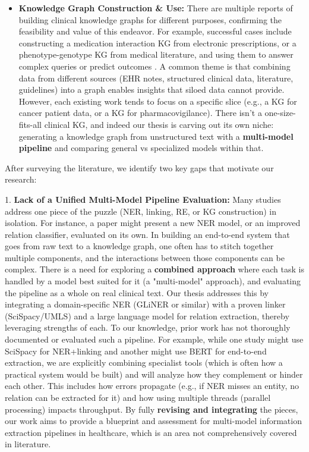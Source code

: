 \begin{itemize}
\item \textbf{Knowledge Graph Construction \& Use:} There are multiple reports of building clinical knowledge graphs for different purposes, confirming the feasibility and value of this endeavor. For example, successful cases include constructing a medication interaction KG from electronic prescriptions, or a phenotype-genotype KG from medical literature, and using them to answer complex queries or predict outcomes \cite{Rotmensch2017}. A common theme is that combining data from different sources (EHR notes, structured clinical data, literature, guidelines) into a graph enables insights that siloed data cannot provide. However, each existing work tends to focus on a specific slice (e.g., a KG for cancer patient data, or a KG for pharmacovigilance). There isn't a one-size-fits-all clinical KG, and indeed our thesis is carving out its own niche: generating a knowledge graph from unstructured text with a \textbf{multi-model pipeline} and comparing general vs specialized models within that.
\end{itemize}

After surveying the literature, we identify two key gaps that motivate our research:

1. \textbf{Lack of a Unified Multi-Model Pipeline Evaluation:} Many studies address one piece of the puzzle (NER, linking, RE, or KG construction) in isolation. For instance, a paper might present a new NER model, or an improved relation classifier, evaluated on its own. In building an end-to-end system that goes from raw text to a knowledge graph, one often has to stitch together multiple components, and the interactions between those components can be complex. There is a need for exploring a \textbf{combined approach} where each task is handled by a model best suited for it (a "multi-model" approach), and evaluating the pipeline as a whole on real clinical text. Our thesis addresses this by integrating a domain-specific NER (GLiNER or similar) with a proven linker (SciSpacy/UMLS) and a large language model for relation extraction, thereby leveraging strengths of each. To our knowledge, prior work has not thoroughly documented or evaluated such a pipeline. For example, while one study might use SciSpacy for NER+linking and another might use BERT for end-to-end extraction, we are explicitly combining specialist tools (which is often how a practical system would be built) and will analyze how they complement or hinder each other. This includes how errors propagate (e.g., if NER misses an entity, no relation can be extracted for it) and how using multiple threads (parallel processing) impacts throughput. By fully \textbf{revising and integrating} the pieces, our work aims to provide a blueprint and assessment for multi-model information extraction pipelines in healthcare, which is an area not comprehensively covered in literature.


